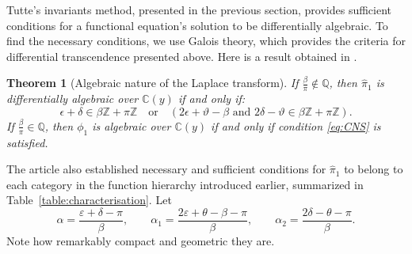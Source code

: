 \documentclass[11pt]{article}
\newcommand\citeS[1]{\cite{#1}}
\newcommand{\C}{\mathbb{C}}
\newcommand{\thetadeux}{y}
\newtheorem{theorem}[thm]{Theorem}
\theoremstyle{definition}
\begin{document}
Tutte’s invariants method, presented in the previous section, provides sufficient conditions for a functional equation's solution to be differentially algebraic.
To find the necessary conditions, we use Galois theory, which provides the criteria for differential transcendence presented above. 
Here is a result obtained in \citeS{franceschi_bousquet_melou_price_hardouin_raschel_stationary_2023}.
\begin{theorem}[Algebraic nature of the Laplace transform]
\label{thm:main_diffalg}
If $\frac{\beta}{\pi}\notin \mathbb Q$, then $\widehat\pi_1$ is differentially algebraic over $\mathbb C(\thetadeux)$ if and only if:
\begin{equation}
\label{eq:CNS}
   \epsilon+\delta\in \beta \mathbb{Z}+ \pi\mathbb{Z}
   \quad \text{or}
   \quad
   (2\epsilon+\vartheta-\beta
\text{ and }   
   2\delta-\vartheta \in \beta \mathbb{Z}+ \pi\mathbb{Z}).
\end{equation}
If $\frac{\beta}{\pi}\in \mathbb Q$, then $\phi_1$ is algebraic over $\C(\thetadeux)$ if and only if condition \eqref{eq:CNS} is satisfied.
\end{theorem}
The article \citeS{franceschi_bousquet_melou_price_hardouin_raschel_stationary_2023} also established necessary and sufficient conditions for $\widehat\pi_1$ to belong to each category in the function hierarchy introduced earlier, summarized in Table~\ref{table:characterisation}. 
Let
\[
\alpha = \frac{\varepsilon+\delta-\pi}{\beta}, 
\qquad 
\alpha_1 = \frac{2\varepsilon+\theta-\beta-\pi}{\beta}, 
\qquad 
\alpha_2 = \frac{2\delta-\theta-\pi}{\beta}.
\]
Note how remarkably compact and geometric they are.
\renewcommand{\arraystretch}{1.5}
\end{document}
